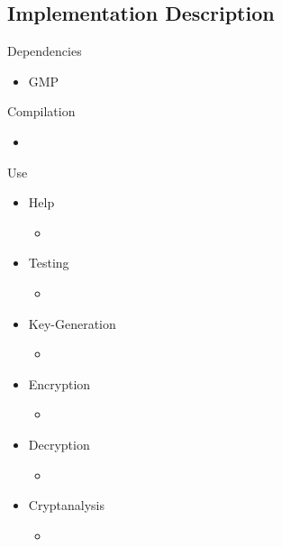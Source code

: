 \subsection{Implementation Description}


Dependencies
\begin{itemize}
  \item GMP
\end{itemize}

Compilation
\begin{itemize}
\item {}
\end{itemize}

Use
\begin{itemize}
\item Help
  \begin{itemize}
  \item {}
\end{itemize}
\item Testing
  \begin{itemize}
  \item {}
  \end{itemize}
\item Key-Generation
  \begin{itemize}
  \item {}
  \end{itemize}
\item Encryption
  \begin{itemize}
  \item {}
  \end{itemize}
\item Decryption
  \begin{itemize}
  \item {}
  \end{itemize}
\item Cryptanalysis
  \begin{itemize}
  \item {}
  \end{itemize}
\end{itemize}
